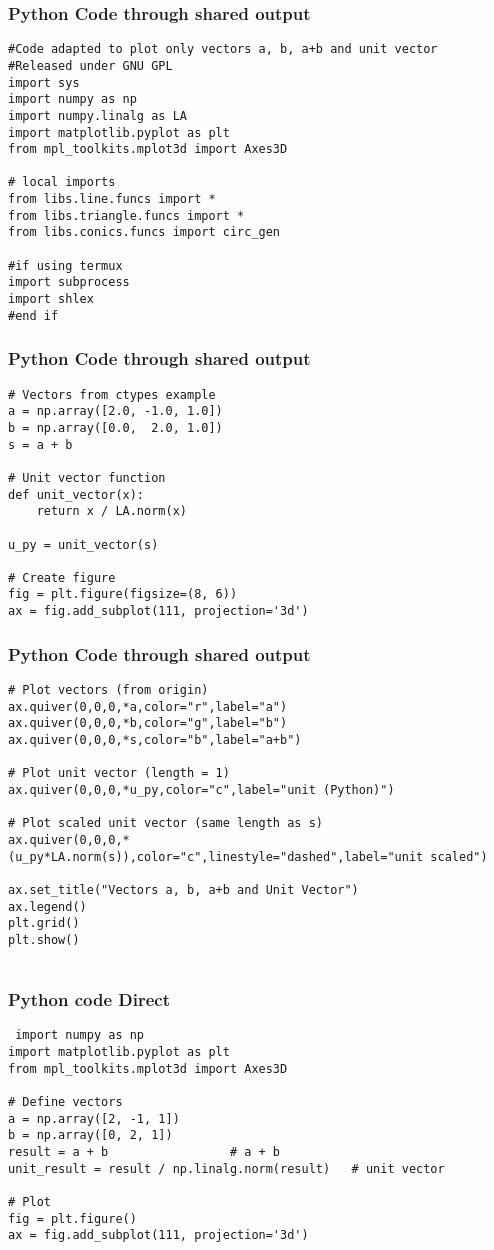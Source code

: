 \documentclass{beamer}
\begin{document}
            \begin{frame}[fragile]
	\frametitle{Python Code through shared output}
	\begin{lstlisting}
#Code adapted to plot only vectors a, b, a+b and unit vector
#Released under GNU GPL
import sys
import numpy as np
import numpy.linalg as LA
import matplotlib.pyplot as plt
from mpl_toolkits.mplot3d import Axes3D

# local imports 
from libs.line.funcs import *
from libs.triangle.funcs import *
from libs.conics.funcs import circ_gen

#if using termux
import subprocess
import shlex
#end if
\end{lstlisting}
            \end{frame}
            \begin{frame}[fragile]
	\frametitle{Python Code through shared output}
	\begin{lstlisting}
# Vectors from ctypes example
a = np.array([2.0, -1.0, 1.0])
b = np.array([0.0,  2.0, 1.0])
s = a + b

# Unit vector function
def unit_vector(x):
    return x / LA.norm(x)

u_py = unit_vector(s)

# Create figure
fig = plt.figure(figsize=(8, 6))
ax = fig.add_subplot(111, projection='3d')
\end{lstlisting}
            \end{frame}
            \begin{frame}[fragile]
	\frametitle{Python Code through shared output}
	\begin{lstlisting}
# Plot vectors (from origin)
ax.quiver(0,0,0,*a,color="r",label="a")
ax.quiver(0,0,0,*b,color="g",label="b")
ax.quiver(0,0,0,*s,color="b",label="a+b")

# Plot unit vector (length = 1)
ax.quiver(0,0,0,*u_py,color="c",label="unit (Python)")

# Plot scaled unit vector (same length as s)
ax.quiver(0,0,0,*(u_py*LA.norm(s)),color="c",linestyle="dashed",label="unit scaled")

ax.set_title("Vectors a, b, a+b and Unit Vector")
ax.legend()
plt.grid()
plt.show()


\end{lstlisting}
            \end{frame}
            
\begin{frame}[fragile]
\frametitle{Python code Direct}
\begin{lstlisting}
 import numpy as np
import matplotlib.pyplot as plt
from mpl_toolkits.mplot3d import Axes3D

# Define vectors
a = np.array([2, -1, 1])
b = np.array([0, 2, 1])
result = a + b                 # a + b
unit_result = result / np.linalg.norm(result)   # unit vector

# Plot
fig = plt.figure()
ax = fig.add_subplot(111, projection='3d')
\end{lstlisting}
            \end{frame}
            
\end{document}
